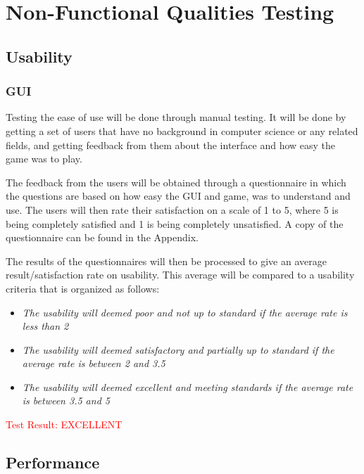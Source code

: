 \documentclass[12pt]{article}
\begin{document}
\section{Non-Functional Qualities Testing}
\subsection{Usability}
\subsubsection{GUI}
	Testing the ease of use will be done through manual testing. It will be done by getting a set of users that have no background in computer science or any related fields, and getting feedback from them about the interface and how easy the game was to play.
	\par The feedback from the users will be obtained through a questionnaire in which the questions are based on how easy the GUI and game, was to understand and use. The users will then rate their satisfaction on a scale of 1 to 5, where 5 is being completely satisfied and 1 is being completely unsatisfied. A copy of the questionnaire can be found in the Appendix.
	\par The results of the questionnaires will then be processed to give an average result/satisfaction rate on usability. This average will be compared to a usability criteria that is organized as follows:
\begin{itemize}
\item\emph{The usability will deemed poor and not up to standard if the average rate is less than 2}
\item\emph{The usability will deemed satisfactory and partially up to standard if the average rate is between 2 and 3.5}
\item\emph{The usability will deemed excellent and meeting standards if the average rate is between 3.5 and 5}
\end{itemize}

\textcolor{red}{Test Result: EXCELLENT}



\subsection{Performance}
\end{document}
